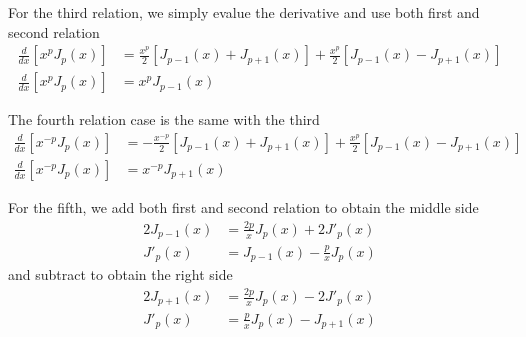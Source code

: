 \documentclass[../main.tex]{subfiles}
\begin{document}
For the third relation, we simply evalue the derivative and use both first and second relation
\begin{align*}
    \frac{d}{dx}\left[x^pJ_p(x)\right]&= \frac{x^p}{2}\left[J_{p-1}(x)+J_{p+1}(x)\right]+\frac{x^p}{2}\left[J_{p-1}(x)-J_{p+1}(x)\right]\\
    \frac{d}{dx}\left[x^pJ_p(x)\right]&=x^pJ_{p-1}(x)
\end{align*}

The fourth relation case is the same with the third 
\begin{align*}
    \frac{d}{dx}\left[x^{-p}J_p(x)\right]&= -\frac{x^{-p}}{2}\left[J_{p-1}(x)+J_{p+1}(x)\right]+\frac{x^p}{2}\left[J_{p-1}(x)-J_{p+1}(x)\right]\\
    \frac{d}{dx}\left[x^{-p}J_p(x)\right]&=x^{-p}J_{p+1}(x)
\end{align*}

For the fifth, we add both first and second relation to obtain the middle side 
\begin{align*}
    2J_{p-1}(x)&=\frac{2p}{x}J_p(x)+2J'_p(x)\\
    J'_{p}(x)&=J_{p-1}(x)-\frac{p}{x}J_p(x)
\end{align*}
and subtract to obtain the right side
\begin{align*}
    2J_{p+1}(x)&=\frac{2p}{x}J_p(x)-2J'_p(x)\\
    J'_{p}(x)&=\frac{p}{x}J_p(x)-J_{p+1}(x)
\end{align*}
\end{document}

